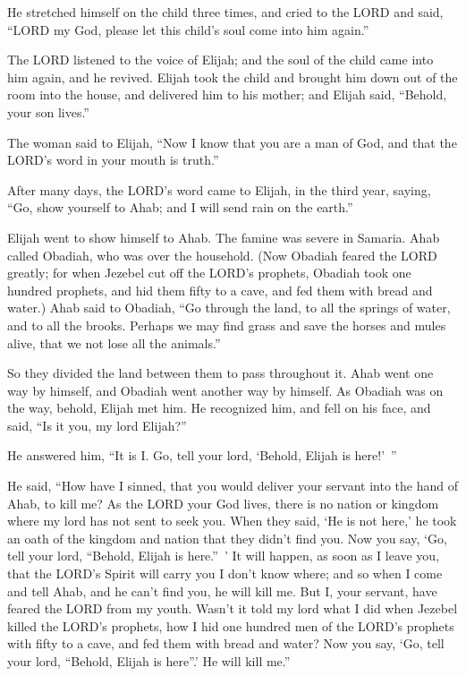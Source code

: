 \myverse{}He stretched himself on the child three times, and cried to
the LORD and said, “LORD my God, please let this child’s soul come into him again.”

\myverse{}The LORD listened to the voice of Elijah; and the soul of the
child came into him again, and he revived.
\myverse{}Elijah took the child and brought him down out of the room into the house,
and delivered him to his mother; and Elijah said, “Behold, your son lives.”

\myverse{}The woman said to Elijah, “Now I know that you are a man of
God, and that the LORD’s word in your mouth is truth.”


\mychapter{} \myverse*{}After many days, the LORD’s word came to Elijah, in the third
year, saying, “Go, show yourself to Ahab; and I will send rain on the earth.”

\myverse{}Elijah went to show himself to Ahab. The famine was severe in
Samaria.
\myverse{}Ahab called Obadiah, who was over the household. (Now Obadiah feared the LORD
greatly;
\myverse{}for when Jezebel cut off the LORD’s prophets, Obadiah took one hundred prophets,
and hid them fifty to a cave, and fed them with bread and water.)
\myverse{}Ahab said to Obadiah, “Go through the land, to all the springs of water, and
to all the brooks. Perhaps we may find grass and save the horses and mules alive, that we not lose all
the animals.”

\myverse{}So they divided the land between them to pass throughout it. Ahab
went one way by himself, and Obadiah went another way by himself.
\myverse{}As Obadiah was on the way, behold, Elijah met him. He recognized him, and fell
on his face, and said, “Is it you, my lord Elijah?”

\myverse{}He answered him, “It is I. Go, tell your lord, ‘Behold, Elijah
is here!’ ”

\myverse{}He said, “How have I sinned, that you would deliver your servant
into the hand of Ahab, to kill me?
\myverse{}As the LORD your God lives, there is no nation or kingdom where my lord has
not sent to seek you. When they said, ‘He is not here,’ he took an oath of the kingdom and nation that
they didn’t find you.
\myverse{}Now you say, ‘Go, tell your lord, “Behold, Elijah is here.” ’
\myverse{}It will happen, as soon as I leave you, that the LORD’s Spirit will carry
you I don’t know where; and so when I come and tell Ahab, and he can’t find you, he will kill me. But
I, your servant, have feared the LORD from my youth.
\myverse{}Wasn’t it told my lord what I did when Jezebel killed the LORD’s prophets,
how I hid one hundred men of the LORD’s prophets with fifty to a cave, and fed them with bread and water?
\myverse{}Now you say, ‘Go, tell your lord, “Behold, Elijah is here”.’ He will kill
me.”

